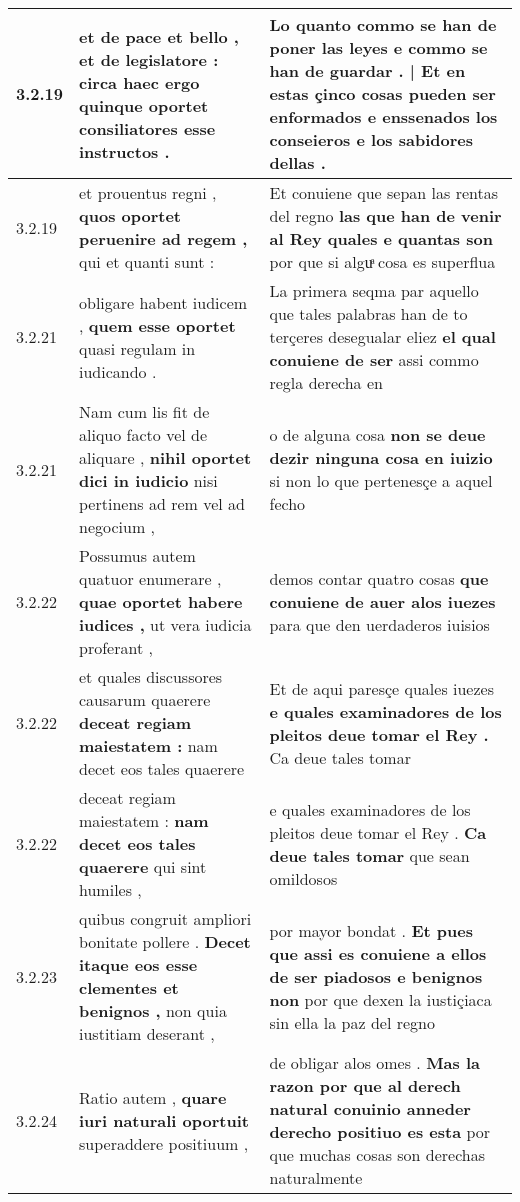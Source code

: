 \begin{tabular}{|p{1cm}|p{6.5cm}|p{6.5cm}|}
3.2.19 & et de pace et bello , et de legislatore : \textbf{ circa haec ergo quinque oportet } consiliatores esse instructos . & Lo quanto commo se han de poner las leyes \textbf{ e commo se han de guardar . | Et en estas çinco cosas pueden ser enformados } e enssenados los conseieros e los sabidores dellas . \\\hline
3.2.19 & et prouentus regni , \textbf{ quos oportet peruenire ad regem , } qui et quanti sunt : & Et conuiene que sepan las rentas del regno \textbf{ las que han de venir al Rey quales e quantas son } por que si alguͣ cosa es superflua \\\hline
3.2.21 & obligare habent iudicem , \textbf{ quem esse oportet } quasi regulam in iudicando . & La primera seqma par aquello que tales palabras han de to terçeres desegualar eliez \textbf{ el qual conuiene de ser } assi commo regla derecha en \\\hline
3.2.21 & Nam cum lis fit de aliquo facto vel de aliquare , \textbf{ nihil oportet dici in iudicio } nisi pertinens ad rem vel ad negocium , & o de alguna cosa \textbf{ non se deue dezir ninguna cosa en iuizio } si non lo que pertenesçe a aquel fecho \\\hline
3.2.22 & Possumus autem quatuor enumerare , \textbf{ quae oportet habere iudices , } ut vera iudicia proferant , & demos contar quatro cosas \textbf{ que conuiene de auer alos iuezes } para que den uerdaderos iuisios \\\hline
3.2.22 & et quales discussores causarum quaerere \textbf{ deceat regiam maiestatem : } nam decet eos tales quaerere & Et de aqui paresçe quales iuezes \textbf{ e quales examinadores de los pleitos deue tomar el Rey . } Ca deue tales tomar \\\hline
3.2.22 & deceat regiam maiestatem : \textbf{ nam decet eos tales quaerere } qui sint humiles , & e quales examinadores de los pleitos deue tomar el Rey . \textbf{ Ca deue tales tomar } que sean omildosos \\\hline
3.2.23 & quibus congruit ampliori bonitate pollere . \textbf{ Decet itaque eos esse clementes et benignos , } non quia iustitiam deserant , & por mayor bondat . \textbf{ Et pues que assi es conuiene a ellos de ser piadosos e benignos non } por que dexen la iustiçiaca sin ella la paz del regno \\\hline
3.2.24 & Ratio autem , \textbf{ quare iuri naturali oportuit } superaddere positiuum , & de obligar alos omes . \textbf{ Mas la razon por que al derech natural conuinio anneder derecho positiuo es esta } por que muchas cosas son derechas naturalmente \\\hline

\end{tabular}
